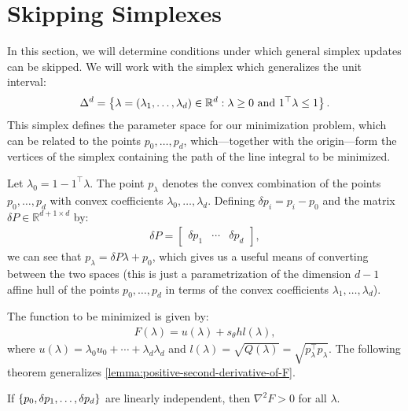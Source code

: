 \documentclass[eikonal.tex]{subfiles}
\begin{document}
\section{Skipping Simplexes}

In this section, we will determine conditions under which general
simplex updates can be skipped. We will work with the simplex which
generalizes the unit interval:
\begin{align*}
  \Delta^d = \left\{\lambda = (\lambda_1, \hdots, \lambda_d) \in \mathbb{R}^d : \lambda \geq 0 \mbox{ and } 1^\top \lambda \leq 1\right\}.
\end{align*}
This simplex defines the parameter space for our minimization problem,
which can be related to the points $p_0, \hdots, p_d$,
which---together with the origin---form the vertices of the simplex
containing the path of the line integral to be minimized.

Let $\lambda_0 = 1 - 1^\top \lambda$. The point $p_\lambda$ denotes
the convex combination of the points $p_0, \hdots, p_d$ with convex
coefficients $\lambda_0, \hdots, \lambda_d$. Defining
$\delta p_i = p_i - p_0$ and the matrix
$\delta P \in \mathbb{R}^{d + 1 \times d}$ by:
\begin{align*}
  \delta P = \begin{bmatrix} \delta p_1 & \cdots & \delta p_d \end{bmatrix},
\end{align*}
we can see that $p_\lambda = \delta P \lambda + p_0$, which gives us a
useful means of converting between the two spaces (this is just a
parametrization of the dimension $d - 1$ affine hull of the points
$p_0, \hdots, p_d$ in terms of the convex coefficients
$\lambda_1, \hdots, \lambda_d$).

The function to be minimized is
given by:
\begin{align*}
  F(\lambda) = u(\lambda) + s_\theta h l(\lambda),
\end{align*}
where $u(\lambda) = \lambda_0 u_0 + \cdots + \lambda_d \lambda_d$ and
$l(\lambda) = \sqrt{Q(\lambda)} = \sqrt{p_\lambda^\top
  p_\lambda}$. The following theorem generalizes
\cref{lemma:positive-second-derivative-of-F}.

\begin{theorem}
  If $\left\{p_0, \delta p_1, \hdots, \delta p_d\right\}$ are linearly
  independent, then $\nabla^2 F > 0$ for all $\lambda$.
\end{theorem}
\end{document}
